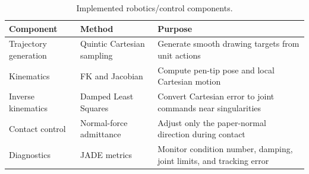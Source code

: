 \begin{table}[H]
\centering
\caption{Implemented robotics/control components.}
\small
\begin{tabularx}{\linewidth}{l l X}
\toprule
Component & Method & Purpose \\
\midrule
Trajectory generation & Quintic Cartesian sampling & Generate smooth drawing targets from unit actions \\
Kinematics & FK and Jacobian & Compute pen-tip pose and local Cartesian motion \\
Inverse kinematics & Damped Least Squares & Convert Cartesian error to joint commands near singularities \\
Contact control & Normal-force admittance & Adjust only the paper-normal direction during contact \\
Diagnostics & JADE metrics & Monitor condition number, damping, joint limits, and tracking error \\
\bottomrule
\end{tabularx}
\end{table}
